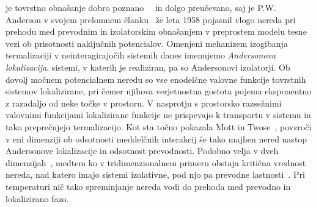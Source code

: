 je tovrstno
obnašanje dobro poznano~\cite{lagendijk2009fifty}~\cite{abrahams201050} in dolgo preučevano, saj je P.W. Anderson v svojem prelomnem članku~\cite{anderson1958absence} že leta 1958 pojasnil vlogo nereda pri prehodu med prevodnim 
in izolatorskim obnašanjem v preprostem modelu tesne vezi ob prisotnosti naključnih potencialov. Omenjeni mehanizem izogibanja termalizaciji v neinteragirajočih sistemih danes imenujemo \emph{Andersonova lokalizacija}, sistemi, v katerih je realiziran, pa so Andersonovi izolatorji. Ob dovolj močnem potencialnem neredu so vse enodelčne valovne funkcije tovrstnih sistemov lokalizirane, pri čemer njihova verjetnostna gostota pojema eksponentno z razadaljo od neke točke v prostoru. V nasprotju s prostorsko razsežnimi valovnimi funkcijami 
lokalizirane 
funkcije ne
 prispevajo k transportu v sistemu in tako preprečujejo termalizacijo. Kot sta točno pokazala Mott in Twose~\cite{doi:10.1080/00018736100101271}, povzroči v eni dimenziji ob odsotnosti meddelčnih interakcij še tako majhen nered nastop Andersonove lokalizacije in odsotnost prevodnosti. Podobno velja v dveh dimenzijah~\cite{abrahams1979scaling}, medtem ko v tridimenzionalnem primeru obstaja kritična vrednost nereda, nad katero imajo sistemi izolativne, pod njo pa prevodne lastnosti~\cite{mott1990metal}. Pri temperaturi nič tako spreminjanje nereda vodi do prehoda med prevodno in lokalizirano fazo. \\\\
